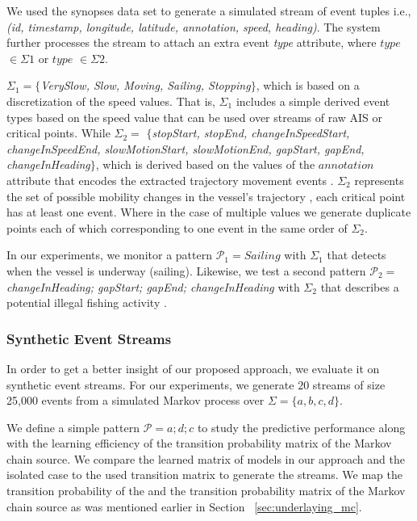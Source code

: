 \par We used the synopses data set to generate a simulated stream of event tuples  i.e., \textit{(id, timestamp, longitude, latitude, annotation, speed, heading)}. The  system further processes the stream to attach an extra event \textit{type} attribute,  where $type$ $\in \Sigma1$ or $type$ $\in \Sigma2$.


\par $\Sigma_1=$$\{$\textit{VerySlow, Slow, Moving,  Sailing, Stopping}$\}$, which is based on a discretization of the speed values. That is, $\Sigma_1$ includes a simple derived event types based on the speed value that can be used over streams of  raw AIS  or critical points. While $\Sigma_2=$ $\{$\textit{stopStart, stopEnd, changeInSpeedStart, changeInSpeedEnd,  slowMotionStart, slowMotionEnd, gapStart, gapEnd, changeInHeading}$\}$, which is derived based on the values of the $annotation$ attribute that encodes the extracted trajectory movement events \cite{synopses1}. $\Sigma_2$ represents the set of possible mobility changes in the vessel's trajectory \cite{synopses1}, each critical point has at least one event. Where in the case of multiple values we generate duplicate points each of which corresponding to one event in the same order of $\Sigma_2$.

\par In our experiments, we monitor a pattern $\mathcal{P}_1=Sailing$ with $\Sigma_1$ that detects when the vessel is underway (sailing). Likewise, we test a second pattern  $\mathcal{P}_2=$\textit{changeInHeading; gapStart; gapEnd; changeInHeading} with $\Sigma_2$ that describes a potential illegal fishing activity \cite{alevizos2017event}. 


\subsubsection*{Synthetic Event Streams}

\par In order to get a better insight of our proposed approach, we evaluate it on synthetic event streams. For our experiments, we generate $20$ streams of size 25,000 events from a simulated Markov process over $\Sigma=\{a, b, c, d\}$.

\par We define a simple pattern $\mathcal{P}=a ; d ; c$ to study the predictive performance along with the learning efficiency of the transition probability matrix of the Markov chain source.  We compare the learned matrix of \pmcmr models in our approach and the isolated case to the used transition matrix to generate the streams. We map the transition probability of the \pmcmr and the transition probability matrix of the Markov chain source as was mentioned earlier in Section ~\ref{sec:underlaying_mc}.
   


